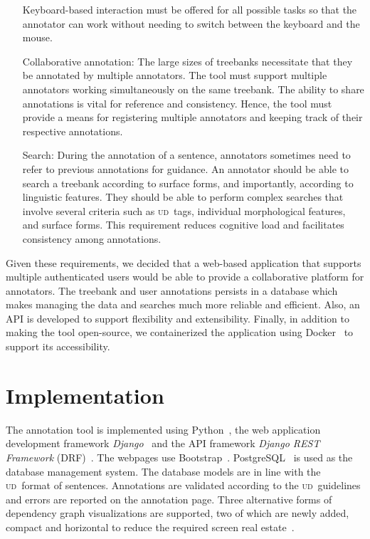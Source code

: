 \documentclass{elektr}
\newcommand{\ud}{\textsc{ud}}
\begin{document}
\begin{itemize}[before=\normalfont, font=\itshape, align=left,noitemsep,topsep=0pt,parsep=3pt,partopsep=0pt,labelsep=3pt,align=left]
        Keyboard-based interaction must be offered for all possible tasks so that the annotator can work without needing to switch between the keyboard and the mouse.
    \item[Collaborative annotation:]
        The large sizes of treebanks necessitate that they be annotated by multiple annotators.
        The tool must support multiple annotators working simultaneously on the same treebank.
        The ability to share annotations is vital for reference and consistency.
        Hence, the tool must provide a means for registering multiple annotators and keeping track of their respective annotations.
    \item[Search:]
        During the annotation of a sentence, annotators sometimes need to refer to previous annotations for guidance.
        An annotator should be able to search a treebank according to surface forms, and importantly, according to linguistic features.
        They should be able to perform complex searches that involve several criteria such as \ud\ tags, individual morphological features, and surface forms.
        This requirement reduces cognitive load and facilitates consistency among annotations.
\end{itemize}

Given these requirements, we decided that a web-based application that supports multiple authenticated users would be able to provide a collaborative platform for annotators.
The treebank and user annotations persists in a database which makes managing the data and searches much more reliable and efficient.
Also, an API is developed to support flexibility and extensibility.
Finally, in addition to making the tool open-source, we containerized the application using Docker~\cite{docker} to support its accessibility.

% 
\section{Implementation}
\label{sec:implementation}

The annotation tool is implemented using Python~\cite{python}, the web application development framework \textit{Django}~\cite{django} and the API framework \textit{Django REST Framework} (DRF)~\cite{drf}.
The webpages use Bootstrap~\cite{bootstrap}.
PostgreSQL~\cite{psql} is used as the database management system.
The database models are in line with the \ud\ format of sentences.
Annotations are validated according to the \ud\ guidelines and errors are reported on the annotation page.
Three alternative forms of dependency graph visualizations are supported, two of which are newly added, compact and horizontal to reduce the required screen real estate~\cite{spacy,spyssalo}.
\end{document}
